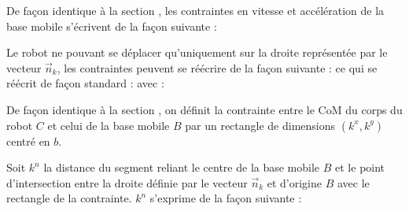				
					De façon identique à la section , les contraintes en vitesse et accélération de la base mobile s'écrivent de la façon suivante :	
					
					Le robot ne pouvant se déplacer qu'uniquement sur la droite représentée par le vecteur $\vec{n}_k$, les contraintes peuvent se réécrire de la façon suivante :
					ce qui se réécrit de façon standard :
					avec :
				
				
					
					De façon identique à la section , on définit la contrainte entre le CoM du corps du robot $C$ et celui de la base mobile $B$ par un rectangle de dimensions $(k^x, k^y)$ centré en $b$.
					
					Soit $k^n$ la distance du segment reliant le centre de la base mobile $B$ et le point d'intersection entre la droite définie par le vecteur $\vec{n}_k$ et d'origine $B$ avec le rectangle de la contrainte. $k^n$ s'exprime de la façon suivante  :
					
